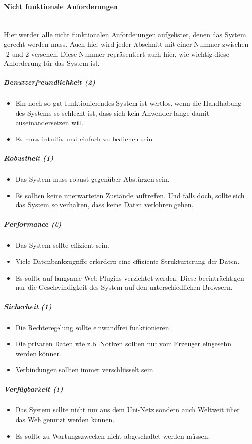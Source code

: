 \documentclass[12pt,a4paper]{article}
\begin{document}
\paragraph{Nicht funktionale Anforderungen}\mbox{}\\
Hier werden alle nicht funktionalen Anforderungen aufgelistet, denen das System gerecht werden muss. Auch hier wird jeder Abschnitt mit einer Nummer zwischen -2 und 2 versehen. Diese Nummer repräsentiert auch hier, wie wichtig diese Anforderung für das System ist.
\subparagraph{Benutzerfreundlichkeit (2)}
\begin{itemize}
\item Ein noch so gut funktionierendes System ist wertlos, wenn die Handhabung des Systems so schlecht ist, dass sich kein Anwender lange damit auseinandersetzen will. 
\item Es muss intuitiv und einfach zu bedienen sein.
\end{itemize}
\subparagraph{Robustheit (1)}
\begin{itemize}
\item Das System muss robust gegenüber Abstürzen sein. 
\item Es sollten keine unerwarteten Zustände auftreffen. Und falls doch, sollte sich das System so verhalten, dass keine Daten verlohren gehen.
\end{itemize}
\subparagraph{Performance (0)}
\begin{itemize}
\item Das System sollte effizient sein.
\item Viele Datenbankzugriffe erfordern eine effiziente Strukturierung der Daten.
\item Es sollte auf langsame Web-Plugins verzichtet werden. Diese beeinträchtigen nur die Geschwindigkeit des System auf den unterschiedlichen Browsern.
\end{itemize}
\subparagraph{Sicherheit (1)}
\begin{itemize}
\item Die Rechteregelung sollte einwandfrei funktionieren.
\item Die privaten Daten wie z.b. Notizen sollten nur vom Erzeuger eingesehn werden können.
\item Verbindungen sollten immer verschlüsselt sein.
\end{itemize}
\subparagraph{Verfügbarkeit (1)}
\begin{itemize}
\item Das System sollte nicht nur aus dem Uni-Netz sondern auch Weltweit über das Web genutzt werden können.
\item Es sollte zu Wartungszwecken nicht abgeschaltet werden müssen.
\end{itemize}
\end{document}
